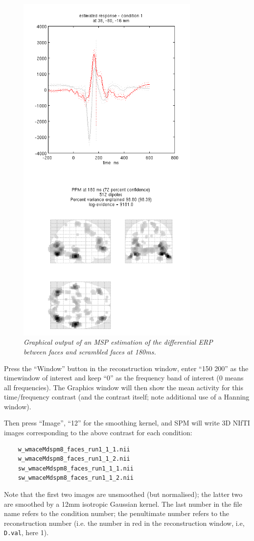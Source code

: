 \begin{figure}
\begin{center}
\includegraphics[width=90mm]{multimodal/figures/eeg_msp.png}
\caption{\em Graphical output of an MSP estimation of the differential ERP between faces and scrambled faces at 180ms. \label{multimodal:fig:9}}
\end{center}
\end{figure}

Press the ``Window'' button in the reconstruction window, enter ``150 200'' as the timewindow of interest and keep ``0'' as the frequency band of interest (0 means all frequencies). The Graphics window will then show the mean activity for this time/frequency contrast (and the contrast itself; note additional use of a Hanning window).

Then press ``Image'', ``12'' for the smoothing kernel, and SPM will write 3D NIfTI images corresponding to the above contrast for each condition:
\begin{verbatim}
    w_wmaceMdspm8_faces_run1_1_1.nii
    w_wmaceMdspm8_faces_run1_1_2.nii
    sw_wmaceMdspm8_faces_run1_1_1.nii
    sw_wmaceMdspm8_faces_run1_1_2.nii
\end{verbatim}
Note that the first two images are unsmoothed (but normalised); the latter two are smoothed by a 12mm isotropic Gaussian kernel. The last number in the file name refers to the condition number; the penultimate number refers to the reconstruction number (i.e. the number in red in the reconstruction window, i.e, \texttt{D.val}, here 1).

